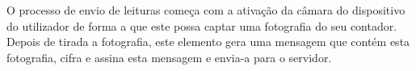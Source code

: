 O processo de envio de leituras começa com a ativação da câmara do dispositivo do utilizador de forma a que este possa captar uma fotografia do seu contador. Depois de tirada a fotografia, este elemento gera uma mensagem que contém esta fotografia, cifra e assina esta mensagem e envia-a para o servidor.










